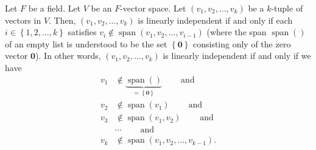 \begin{lemma}
\label{lem.linalg.lin-ind-via-span}
\leantarget
\leanok
Let $F$ be a field. Let $V$ be an
$F$-vector space. Let $\left(  v_{1},v_{2},\ldots,v_{k}\right)  $ be a
$k$-tuple of vectors in $V$. Then, $\left(  v_{1},v_{2},\ldots,v_{k}\right)  $
is linearly independent if and only if each $i\in\left\{  1,2,\ldots
,k\right\}  $ satisfies $v_{i}\notin\operatorname{span}\left(  v_{1}%
,v_{2},\ldots,v_{i-1}\right)  $ (where the span $\operatorname{span}\left(
{}\right)  $ of an empty list is understood to be the set $\left\{
\mathbf{0}\right\}  $ consisting only of the zero vector $\mathbf{0}$). In
other words, $\left(  v_{1},v_{2},\ldots,v_{k}\right)  $ is linearly
independent if and only if we have
\begin{align*}
v_{1}  &  \notin\underbrace{\operatorname{span}\left(  {}\right)
}_{=\left\{  \mathbf{0}\right\}  }\ \ \ \ \ \ \ \ \ \ \text{and}\\
v_{2}  &  \notin\operatorname{span}\left(  v_{1}\right)
\ \ \ \ \ \ \ \ \ \ \text{and}\\
v_{3}  &  \notin\operatorname{span}\left(  v_{1},v_{2}\right)
\ \ \ \ \ \ \ \ \ \ \text{and}\\
&  \cdots\ \ \ \ \ \ \ \ \ \ \text{and}\\
v_{k}  &  \notin\operatorname{span}\left(  v_{1},v_{2},\ldots,v_{k-1}\right)
.
\end{align*}
\end{lemma}

